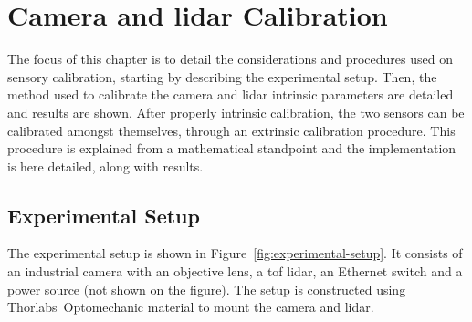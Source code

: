\chapter{Camera and \acs{lidar} Calibration}
\label{chapter:calibration}

The focus of this chapter is to detail the considerations and procedures used on sensory calibration, starting by describing the experimental setup. Then, the method used to calibrate the camera and \ac{lidar} intrinsic parameters are detailed and results are shown. After properly intrinsic calibration, the two sensors can be calibrated amongst themselves, through an extrinsic calibration procedure. This procedure is explained from a mathematical standpoint and the implementation is here detailed, along with results.


\section{Experimental Setup}
\label{sec:calibration:experimental-setup}
The experimental setup is shown in Figure~\ref{fig:experimental-setup}. It consists of an industrial camera with an objective lens, a \ac{tof} \ac{lidar}, an Ethernet switch and a power source (not shown on the figure). The setup is constructed using Thorlabs\cp~Optomechanic material to mount the camera and \ac{lidar}.

